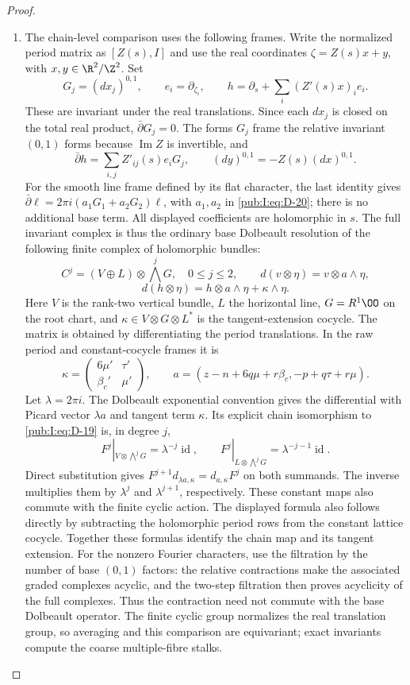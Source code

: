 \begin{proof}
\begin{enumerate}[label=\arabic*.,leftmargin=*]
\item The chain-level comparison uses the following frames. Write the normalized period matrix as $[Z(s),I]$
and use the real coordinates $\zeta=Z(s)x+y$, with
$x,y\in\R^2/\Z^2$. Set
\[
 G_j=(dx_j)^{0,1},\qquad e_i=\partial_{\zeta_i},\qquad
 h=\partial_s+\sum_i(Z'(s)x)_i e_i.
\]
These are invariant under the real translations. Since each $dx_j$
is closed on the total real product, $\bar\partial G_j=0$.
The forms $G_j$ frame the relative invariant $(0,1)$ forms because
$\operatorname{Im}Z$ is invertible, and
\[
 \bar\partial h=\sum_{i,j}Z'_{ij}(s)e_iG_j,
 \qquad (dy)^{0,1}=-Z(s)(dx)^{0,1}.
\]
For the smooth line frame defined by its flat character, the last
identity gives $\bar\partial\ell=2\pi i(a_1G_1+a_2G_2)\ell$,
with $a_1,a_2$ in \eqref{pub:I:eq:D-20}; there is no additional base term.
All displayed coefficients are holomorphic in $s$. The full
invariant complex is thus the ordinary base Dolbeault resolution
of the following finite complex of holomorphic bundles:
\[
 C^j=(V\oplus L)\otimes\bigwedge^jG,\quad0\le j\le2,
 \qquad
 d(v\otimes\eta)=v\otimes a\wedge\eta,
\]
\begin{equation}
 d(h\otimes\eta)=h\otimes a\wedge\eta+\kappa\wedge\eta.
\label{pub:I:eq:D-19}
\end{equation}
Here $V$ is the rank-two vertical bundle, $L$ the horizontal line,
$G=R^1\OO$ on the root chart, and $\kappa\in V\otimes G\otimes L^*$
is the tangent-extension cocycle. The matrix is obtained
by differentiating the period translations. In the raw period and
constant-cocycle frames it is
\begin{equation}
 \kappa=\begin{pmatrix}6\mu'&\tau'\\\beta_c'&\mu'\end{pmatrix},
 \qquad
 a=(z-n+6q\mu+r\beta_c,-p+q\tau+r\mu).
\label{pub:I:eq:D-20}
\end{equation}
Let $\lambda=2\pi i$. The Dolbeault exponential convention gives
the differential with Picard vector $\lambda a$ and tangent term
$\kappa$. Its explicit chain isomorphism to \eqref{pub:I:eq:D-19} is, in degree $j$,
\[
 F^j|_{V\otimes\bigwedge^jG}=\lambda^{-j}\operatorname{id},
 \qquad
 F^j|_{L\otimes\bigwedge^jG}=\lambda^{-j-1}\operatorname{id}.
\]
Direct substitution gives $F^{j+1}d_{\lambda a,\kappa}
=d_{a,\kappa}F^j$ on both summands. The inverse multiplies them
by $\lambda^j$ and $\lambda^{j+1}$, respectively. These constant
maps also commute with the finite cyclic action. The displayed formula also follows directly by
subtracting the holomorphic period rows from the constant lattice
cocycle. Together these formulas identify the chain map and its tangent extension.
For the nonzero Fourier characters, use the filtration by the number
of base $(0,1)$ factors: the relative contractions make the associated
graded complexes acyclic, and the two-step filtration then proves
acyclicity of the full complexes. Thus the contraction need not
commute with the base Dolbeault operator. The finite cyclic group
normalizes the real translation group, so averaging and this
comparison are equivariant; exact invariants compute the coarse
multiple-fibre stalks.


\end{enumerate}
\end{proof}
